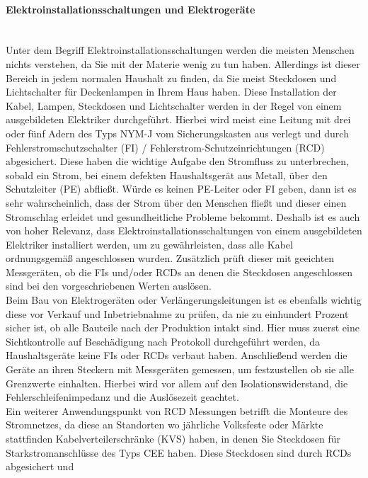 \paragraph{Elektroinstallationsschaltungen und Elektrogeräte}\mbox{}\\
Unter dem Begriff Elektroinstallationsschaltungen werden die meisten Menschen nichts verstehen, da Sie mit der Materie wenig zu tun haben. Allerdings ist dieser 
Bereich in jedem normalen Haushalt zu finden, da Sie meist Steckdosen und Lichtschalter für Deckenlampen in Ihrem Haus haben. Diese Installation der Kabel, 
Lampen, Steckdosen und Lichtschalter werden in der Regel von einem ausgebildeten Elektriker durchgeführt. Hierbei wird meist eine Leitung mit drei oder 
fünf Adern des Typs NYM-J vom Sicherungskasten aus verlegt und durch Fehlerstromschutzschalter (FI) / Fehlerstrom-Schutzeinrichtungen (RCD) abgesichert. 
Diese haben die wichtige Aufgabe den Stromfluss zu unterbrechen, sobald ein Strom, \zB bei einem defekten Haushaltsgerät aus Metall, über den Schutzleiter (PE) 
abfließt. Würde es keinen PE-Leiter oder FI geben, dann ist es sehr wahrscheinlich, dass der Strom über den Menschen fließt und dieser einen Stromschlag 
erleidet und gesundheitliche Probleme bekommt. Deshalb ist es auch von hoher Relevanz, dass Elektroinstallationsschaltungen von einem ausgebildeten Elektriker 
installiert werden, um zu gewährleisten, dass alle Kabel ordnungsgemäß angeschlossen wurden. Zusätzlich prüft dieser mit geeichten Messgeräten, ob die 
FIs und/oder RCDs an denen die Steckdosen angeschlossen sind bei den vorgeschriebenen Werten auslösen.\\
Beim Bau von Elektrogeräten oder Verlängerungsleitungen ist es ebenfalls wichtig diese vor Verkauf und Inbetriebnahme zu prüfen, da nie zu einhundert 
Prozent sicher ist, ob alle Bauteile nach der Produktion intakt sind. Hier muss zuerst eine Sichtkontrolle auf Beschädigung nach Protokoll durchgeführt 
werden, da Haushaltsgeräte keine FIs oder RCDs verbaut haben. Anschließend werden die Geräte an ihren Steckern mit Messgeräten gemessen, um festzustellen 
ob sie alle Grenzwerte einhalten. Hierbei wird vor allem auf den Isolationswiderstand, die Fehlerschleifenimpedanz und die Auslösezeit geachtet.\\
Ein weiterer Anwendungspunkt von RCD Messungen betrifft die Monteure des Stromnetzes, da diese an Standorten wo jährliche Volksfeste oder Märkte stattfinden 
Kabelverteilerschränke (KVS) haben, in denen Sie Steckdosen für Starkstromanschlüsse des Typs CEE haben. Diese Steckdosen sind durch RCDs abgesichert und 
